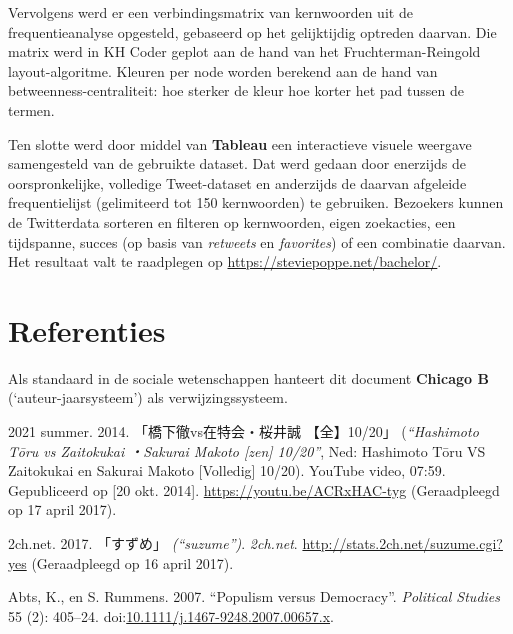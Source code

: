 \documentclass[10.5pt,dutch,]{article}
\begin{document}
Vervolgens werd er een verbindingsmatrix van kernwoorden uit de
frequentieanalyse opgesteld, gebaseerd op het gelijktijdig optreden
daarvan. Die matrix werd in KH Coder geplot aan de hand van het
Fruchterman-Reingold layout-algoritme. Kleuren per node worden berekend
aan de hand van betweenness-centraliteit: hoe sterker de kleur hoe
korter het pad tussen de termen.

Ten slotte werd door middel van \textbf{Tableau} een interactieve
visuele weergave samengesteld van de gebruikte dataset. Dat werd gedaan
door enerzijds de oorspronkelijke, volledige Tweet-dataset en anderzijds
de daarvan afgeleide frequentielijst (gelimiteerd tot 150 kernwoorden)
te gebruiken. Bezoekers kunnen de Twitterdata sorteren en filteren op
kernwoorden, eigen zoekacties, een tijdspanne, succes (op basis van
\emph{retweets} en \emph{favorites}) of een combinatie daarvan. Het
resultaat valt te raadplegen op \url{https://steviepoppe.net/bachelor/}.

\newpage

\section*{Referenties}

\setlength{\parindent}{-0.2in} \setlength{\leftskip}{0.2in}
\setlength{\parskip}{0em} \noindent

Als standaard in de sociale wetenschappen hanteert dit document
\textbf{Chicago B} (`auteur-jaarsysteem') als verwijzingssysteem.

\vspace{4mm}

\setlength{\parskip}{0em} \footnotesize

\hypertarget{refs}{}
\hypertarget{ref-2021ux5fsummerux5fhashimotoux5f2014}{}
2021 summer. 2014. 「橋下徹vs在特会・桜井誠 【全】10/20」 (\emph{“Hashimoto Tōru vs Zaitokukai ・Sakurai Makoto [zen] 10/20”}, Ned: Hashimoto Tōru VS Zaitokukai  en Sakurai Makoto [Volledig] 10/20). YouTube video, 07:59. Gepubliceerd op [20 okt. 2014]. \url{https://youtu.be/ACRxHAC-tyg} (Geraadpleegd op 17 april 2017).

\hypertarget{ref-2ch.netux5fsuzumeux5f2017}{}
2ch.net. 2017. 「すずめ」 \emph{(“suzume”)}. \emph{2ch.net}. \url{http://stats.2ch.net/suzume.cgi?yes} (Geraadpleegd op 16 april 2017).

\hypertarget{ref-abtsux5fpopulismux5f2007}{}
Abts, K., en S. Rummens. 2007. “Populism versus Democracy”. 
\emph{Political Studies} 55 (2): 405--24.
doi:\href{https://doi.org/10.1111/j.1467-9248.2007.00657.x}{10.1111/j.1467-9248.2007.00657.x}.
\end{document}
